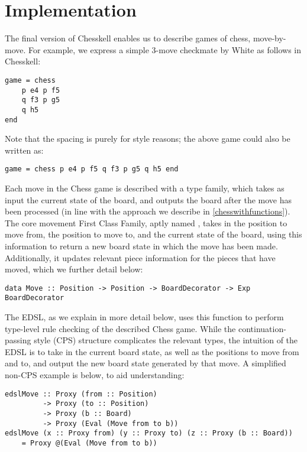 \chapter{Implementation} \label{examplegame}

The final version of Chesskell enables us to describe games of chess, move-by-move. For example, we express a simple 3-move checkmate by White as follows in Chesskell:

\begin{lstlisting}
game = chess
    p e4 p f5
    q f3 p g5
    q h5
end
\end{lstlisting}

Note that the spacing is purely for style reasons; the above game could also be written as:

\begin{lstlisting}
game = chess p e4 p f5 q f3 p g5 q h5 end
\end{lstlisting}

Each move in the Chess game is described with a type family, which takes as input the current state of the board, and outputs the board after the move has been processed (in line with the approach we describe in \cref{chesswithfunctions}). The core movement First Class Family, aptly named , takes in the position to move from, the position to move to, and the current state of the board, using this information to return a new board state in which the move has been made. Additionally, it updates relevant piece information for the pieces that have moved, which we further detail below:

\begin{lstlisting}
data Move :: Position -> Position -> BoardDecorator -> Exp BoardDecorator
\end{lstlisting}

The EDSL, as we explain in more detail below, uses this  function to perform type-level rule checking of the described Chess game. While the continuation-passing style (CPS) structure complicates the relevant types, the intuition of the EDSL is to take in the current board state, as well as the positions to move from and to, and output the new board state generated by that move. A simplified non-CPS example is below, to aid understanding:

\begin{lstlisting}
edslMove :: Proxy (from :: Position)
         -> Proxy (to :: Position)
         -> Proxy (b :: Board)
         -> Proxy (Eval (Move from to b))
edslMove (x :: Proxy from) (y :: Proxy to) (z :: Proxy (b :: Board))
    = Proxy @(Eval (Move from to b))
\end{lstlisting}

